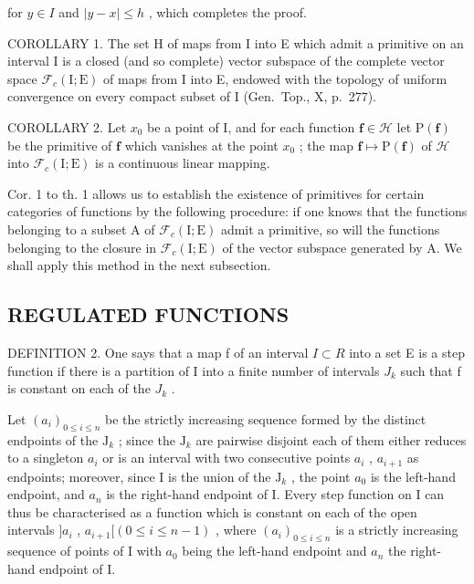for \(y \in I\) and \(|y - x| \leqslant h\) , which completes the proof.

COROLLARY 1. The set H of maps from I into E which admit a primitive on an interval I is a closed (and so complete) vector subspace of the complete vector space \(\mathcal{F}_{c}(\mathrm{I};\mathrm{E})\) of maps from I into E, endowed with the topology of uniform convergence on every compact subset of I (Gen.~Top., X, p.~277).

COROLLARY 2. Let \(x_0\) be a point of I, and for each function \(\mathbf{f} \in \mathcal{H}\) let \(\mathrm{P}(\mathbf{f})\) be the primitive of \(\mathbf{f}\) which vanishes at the point \(x_0\) ; the map \(\mathbf{f} \mapsto \mathrm{P}(\mathbf{f})\) of \(\mathcal{H}\) into \(\mathcal{F}_c(\mathrm{I};\mathrm{E})\) is a continuous linear mapping.

Cor. 1 to th. 1 allows us to establish the existence of primitives for certain categories of functions by the following procedure: if one knows that the functions belonging to a subset A of \(\mathcal{F}_{c}(\mathrm{I};\mathrm{E})\) admit a primitive, so will the functions belonging to the closure in \(\mathcal{F}_{c}(\mathrm{I};\mathrm{E})\) of the vector subspace generated by A. We shall apply this method in the next subsection.

\subsection{REGULATED FUNCTIONS}

DEFINITION 2. One says that a map f of an interval \(I \subset R\) into a set E is a step function if there is a partition of I into a finite number of intervals \(J_{k}\) such that f is constant on each of the \(J_{k}\) .

Let \((a_{i})_{0\leqslant i\leqslant n}\) be the strictly increasing sequence formed by the distinct endpoints of the \(\mathrm{J}_k\) ; since the \(\mathrm{J}_k\) are pairwise disjoint each of them either reduces to a singleton \(a_{i}\) or is an interval with two consecutive points \(a_{i}\) , \(a_{i + 1}\) as endpoints; moreover, since I is the union of the \(\mathrm{J}_k\) , the point \(a_0\) is the left-hand endpoint, and \(a_{n}\) is the right-hand endpoint of I. Every step function on I can thus be characterised as a function which is constant on each of the open intervals \(]a_{i}\) , \(a_{i+1}[ (0 \leqslant i \leqslant n-1)\) , where \((a_{i})_{0 \leqslant i \leqslant n}\) is a strictly increasing sequence of points of I with \(a_{0}\) being the left-hand endpoint and \(a_{n}\) the right-hand endpoint of I.

